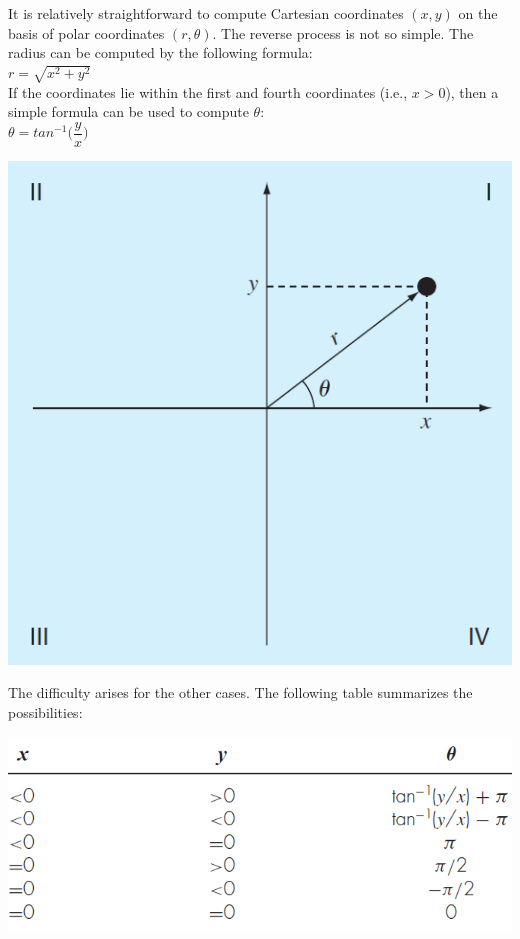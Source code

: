 \documentclass[../main.tex]{subfiles}
\begin{document}
\begin{multicols}{2}
    \noindent
    It is relatively straightforward to compute Cartesian coordinates
    $(x, y)$ on the basis of polar coordinates $(r, \theta)$. The
    reverse process is not so simple. The radius can be computed
    by the following formula:\\

    $r = \sqrt{x^2 + y^2}$\\

    \noindent If the coordinates lie within the first and fourth coordinates
    (i.e., $x > 0$), then a simple formula can be used to
    compute $\theta$:\\

    $\theta = tan^{-1}\Big(\dfrac{y}{x} \Big)$\\

    \noindent
    \begin{minipage}{\linewidth}
        \centering
        \includegraphics[width=0.9\linewidth]{./images/problem_3_3_4}
    \end{minipage}


    \noindent The difficulty arises for the other cases. The following table
    summarizes the possibilities:\\

    \noindent
    \begin{minipage}{\linewidth}
        \centering
        \includegraphics[width=0.9\linewidth]{./images/problem_3_3_5}
    \end{minipage}


\end{multicols}
\end{document}
